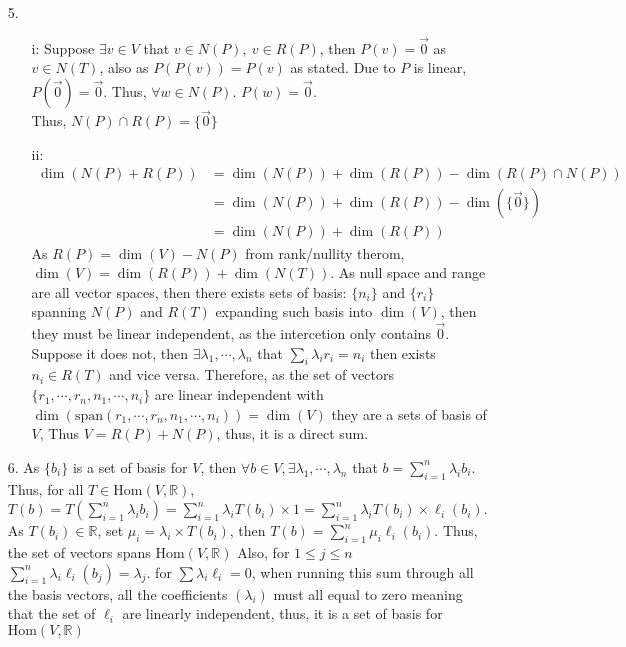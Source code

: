 \documentclass{article}
\begin{document}
\begin{itemize}
    \item [5.]
    \begin{itemize}
        \item [i:] Suppose \(\exists v\in V\) that \(v\in N(P),\ v \in R(P)\), then \(P(v) = \overrightarrow{0}\) as \(v\in N(T)\), also as \(P(P(v)) = P(v)\) as stated. Due to \(P\) is linear, \(P(\overrightarrow{0}) = \overrightarrow{0}\). Thus, \(\forall w\in N(P)\). \(P(w)=\overrightarrow{0}\). \\ Thus, \(N(P)\cap R(P) = \{\overrightarrow{0}\}\)
        \item [ii:]\begin{align*}
            \dim (N(P)+R(P)) &= \dim(N(P))+\dim(R(P))-\dim(R(P)\cap N(P))\\
            &=\dim(N(P))+\dim(R(P))-\dim(\{\overrightarrow{0}\})\\
            &=\dim(N(P))+\dim(R(P))
        \end{align*}
        As \(R(P) = \dim(V) - N(P)\) from rank/nullity therom,\\ \(\dim(V) = \dim(R(P))+\dim(N(T))\). As null space and range are all vector spaces, then there exists sets of basis: \(\{n_i\}\) and \(\{r_i\}\) spanning \(N(P)\) and \(R(T)\) expanding such basis into \(\dim(V)\), then they must be linear independent, as the intercetion only contains \(\overrightarrow{0}\). Suppose it does not, then \(\exists \lambda_1,\cdots,\lambda_n\) that \(\sum_i \lambda_i r_i = n_i\) then exists \(n_i\in R(T)\) and vice versa.
        Therefore, as the set of vectors \(\{r_1,\cdots,r_n,n_1,\cdots,n_i\}\) are linear independent with
        \\ \(\dim(\text{span}(r_1,\cdots,r_n,n_1,\cdots,n_i)) = \dim(V)\) they are a sets of basis of \(V\), Thus \(V = R(P)+N(P)\), thus, it is a direct sum.
    \end{itemize}
    \item [6.] As \(\{b_i\}\) is a set of basis for \(V\), then \(\forall b \in V, \exists \lambda_1,\cdots,\lambda_n\) that \(b = \sum_{i=1}^n \lambda_ib_i\). 
    Thus, for all \(T\in \text{Hom}(V,\mathbb{R})\),\\  \(T(b) = T(\sum_{i=1}^n \lambda_ib_i) = \sum_{i=1}^n\lambda_iT(b_i)\times 1 = \sum_{i=1}^n\lambda_iT(b_i)\times \ell_i(b_i) \). As \(T(b_i)\in \mathbb{R}\), set \(\mu_i = \lambda_i\times T(b_i)\), then \(T(b)=\sum_{i=1}^{n}\mu_i \ell_i(b_i)\). Thus, the set of vectors spans \(\text{Hom}(V,\mathbb{R})\)
    Also, for \(1\leq j \leq n\) \(\sum_{i=1}^{n}\lambda_i\ell_i(b_j) = \lambda_j\). for \(\sum \lambda_i\ell_i = 0\), when running this sum through all the basis vectors, all the coefficients \((\lambda_i)\) must all equal to zero meaning that the set of \(\ell _i\) are linearly independent, thus, it is a set of basis for \(\text{Hom}(V,\mathbb{R})\)

\end{itemize}
\end{document}

